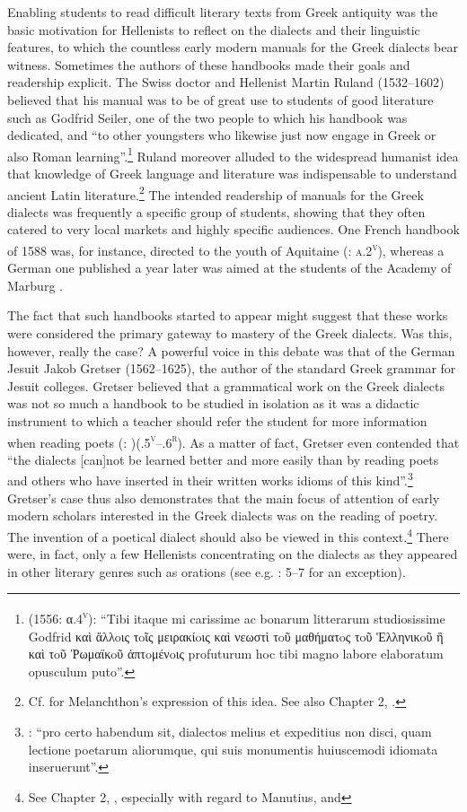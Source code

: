 Enabling students to read difficult literary texts from Greek antiquity was the basic motivation for Hellenists to reflect on the dialects and their linguistic features, to which the countless early modern manuals for the Greek dialects bear witness. Sometimes the authors of these handbooks made their goals and readership explicit. The Swiss doctor and Hellenist Martin Ruland (1532–1602) believed that his manual was to be of great use to students of good literature such as Godfrid Seiler, one of the two people to which his handbook was dedicated, and “to other youngsters who likewise just now engage in Greek or also Roman learning”.\footnote{\citet{Ruland1556} (1556: α.4\textsc{\textsuperscript{v}}): “Tibi itaque mi carissime ac bonarum litterarum studiosissime Godfrid καὶ ἄλλoις τoῖς μειρακίoις καὶ νεωστὶ τoῦ μαθήματoς τoῦ Ἑλληνικoῦ ἢ καὶ τoῦ Ῥωμαϊκoῦ ἁπτoμένoις profuturum hoc tibi magno labore elaboratum opusculum puto”.} Ruland moreover alluded to the widespread humanist idea that knowledge of Greek language and literature was indispensable to understand ancient Latin literature.\footnote{Cf. \citet[139]{Ben-Tov2009} for Melanchthon’s expression of this idea. See also Chapter 2, .} The intended readership of manuals for the Greek dialects was frequently a specific group of students, showing that they often catered to very local markets and highly specific audiences. One French handbook of 1588 was, for instance, directed to the youth of Aquitaine (\citealt{Baile1588}: \textsc{a.2}\textsc{\textsuperscript{v}}), whereas a German one published a year later was aimed at the students of the Academy of Marburg \citep{Walper1589}.

The fact that such handbooks started to appear might suggest that these works were considered the primary gateway to mastery of the Greek dialects. Was this, however, really the case? A powerful voice in this debate was that of the German Jesuit Jakob Gretser (1562–1625), the author of the standard Greek grammar for Jesuit colleges. Gretser believed that a grammatical work on the Greek dialects was not so much a handbook to be studied in isolation as it was a didactic instrument to which a teacher should refer the student for more information when reading poets (\citealt{Gretser1593}: )(.5\textsc{\textsuperscript{v}}–.6\textsc{\textsuperscript{r}}). As a matter of fact, Gretser even contended that “the dialects [can]not be learned better and more easily than by reading poets and others who have inserted in their written works idioms of this kind”.\footnote{\citet[.5\textsc{\textsuperscript{v}}]{Gretser1593}: “pro certo habendum sit, dialectos melius et expeditius non disci, quam lectione poetarum aliorumque, qui suis monumentis huiuscemodi idiomata inseruerunt”.} Gretser’s case thus also demonstrates that the main focus of attention of early modern scholars interested in the Greek dialects was on the reading of poetry. The invention of a poetical dialect should also be viewed in this context.\footnote{See Chapter 2, , especially with regard to Manutius, and } There were, in fact, only a few Hellenists concentrating on the dialects as they appeared in other literary genres such as orations (see e.g. \citealt{Labbe1639}: 5–7 for an exception).

